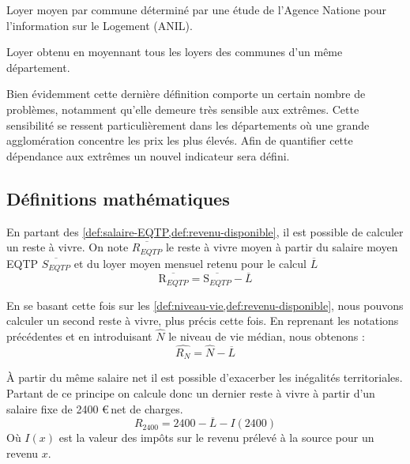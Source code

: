 \begin{definition}\label{def:loyer-eq-commune}
Loyer moyen par commune déterminé par une étude de l'Agence Natione pour l'information sur le Logement (ANIL).
\end{definition}

\begin{definition}\label{def:loyer-moyen-departement}
    Loyer obtenu en moyennant tous les loyers des communes d'un même département.
\end{definition}

Bien évidemment cette dernière définition comporte un certain nombre de problèmes, notamment qu'elle demeure très sensible aux extrêmes. Cette sensibilité se ressent particulièrement dans les départements où une grande agglomération concentre les prix les plus élevés. Afin de quantifier cette dépendance aux extrêmes un nouvel indicateur sera défini. 

\subsection{Définitions mathématiques}

\begin{definition}
    En partant des \cref{def:salaire-EQTP,def:revenu-disponible}, il est possible de calculer un reste à vivre. On note $\overline{R_{EQTP}}$ le reste à vivre moyen à partir du salaire moyen EQTP $\overline{S_{EQTP}}$ et du loyer moyen mensuel retenu pour le calcul $\overline{L}$
    \begin{equation}
        \overline{\mathrm{R}_{EQTP}} = \overline{\mathrm{S}_{EQTP}} - \overline{L}
    \end{equation}
\end{definition}

\begin{definition}
    En se basant cette fois sur les \cref{def:niveau-vie,def:revenu-disponible}, nous pouvons calculer un second reste à vivre, plus précis cette fois. En reprenant les notations précédentes et en introduisant $\hat{N}$ le niveau de vie médian, nous obtenons :
    \begin{equation}
        \hat{R_{N}} = \hat{N} - \overline{L}
    \end{equation}
\end{definition}

\begin{definition}
    À partir du même salaire net il est possible d'exacerber les inégalités territoriales. Partant de ce principe on calcule donc un dernier reste à vivre à partir d'un salaire fixe de 2400 \euro \,net de charges.
    \begin{equation}
        R_{2400} = 2400 - \overline{L} - I(2400)
    \end{equation}
    Où $I(x)$ est la valeur des impôts sur le revenu prélevé à la source pour un revenu $x$.
\end{definition}